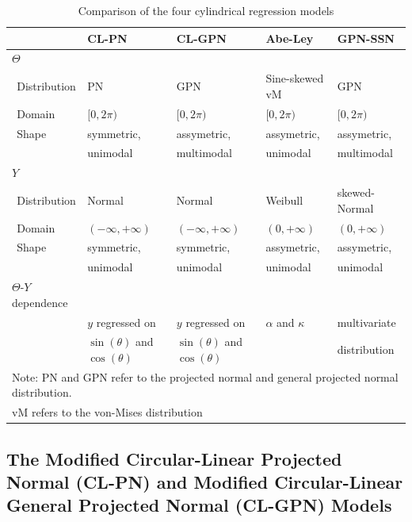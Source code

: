 \documentclass[man]{apa6}
\theoremstyle{definition}
\theoremstyle{definition}
\theoremstyle{definition}
\theoremstyle{remark}
\begin{document}
\begin{table}
\centering
\caption{Comparison of the four cylindrical regression models} 
\begin{tabular}{lllll}
  \noalign{\smallskip}\hline\noalign{\smallskip}
\multicolumn{1}{l}{Aspect} & CL-PN & CL-GPN  & Abe-Ley  & GPN-SSN \\ \hline\noalign{\smallskip}
$\Theta$ & &&&\\
$\:\:$Distribution& PN & GPN & Sine-skewed vM & GPN\\
$\:\:$Domain & $[0, 2\pi)$ & $[0, 2\pi)$ & $[0, 2\pi)$ & $[0, 2\pi)$\\
$\:\:$Shape & symmetric, & assymetric, & assymetric, & assymetric, \\
            & unimodal  & multimodal & unimodal   & multimodal \\\hline\noalign{\smallskip}
$Y$& &&&\\
$\:\:$Distribution & Normal & Normal & Weibull & skewed-Normal\\
$\:\:$Domain & $(-\infty, + \infty)$ & $(-\infty, + \infty)$ & $(0, + \infty)$ & $(0, + \infty)$\\
$\:\:$Shape & symmetric, & symmetric, & assymetric, & assymetric, \\
            & unimodal  & unimodal  & unimodal   & unimodal\\\hline\noalign{\smallskip}
$\Theta$-$Y$ dependence &                                   &                                   & & \\
                        & $y$ regressed on                  & $y$ regressed on                  & $\alpha$ and $\kappa$ & multivariate \\
                        & $\sin(\theta)$ and $\cos(\theta)$ & $\sin(\theta)$ and $\cos(\theta)$ & & distribution\\\hline
\multicolumn{5}{l}{Note: PN and GPN refer to the projected normal and general projected normal distribution.}\\
\multicolumn{5}{l}{vM refers to the von-Mises distribution}\\

\end{tabular}
\label{TableModels}
\end{table}

\subsection{The Modified Circular-Linear Projected Normal (CL-PN) and Modified Circular-Linear General Projected Normal (CL-GPN) Models}\label{CL-(G)PN}
\end{document}
